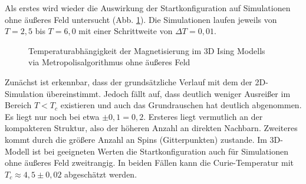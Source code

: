 Als erstes wird wieder die Auswirkung der Startkonfiguration auf Simulationen ohne äußeres Feld untersucht (Abb. \ref{mp3d0modes}). Die Simulationen laufen jeweils von $T=2,5$ bis $T=6,0$ mit einer Schrittweite von $\Delta T= 0,01$.
\begin{figure}[H]
	\centering
	\caption{Temperaturabhängigkeit der Magnetisierung im 3D Ising Modells via Metropolisalgorithmus ohne äußeres Feld}
	\label{mp3d0modes}
\end{figure}
Zunächst ist erkennbar, dass der grundsätzliche Verlauf mit dem der 2D-Simulation übereinstimmt. Jedoch fällt auf, dass deutlich weniger Ausreißer im Bereich $T<T_{c}$ existieren und auch das Grundrauschen hat deutlich abgenommen. Es liegt nur noch bei etwa $\pm 0,1 = 0,2$. Ersteres liegt vermutlich an der kompakteren Struktur, also der höheren Anzahl an direkten Nachbarn. Zweiteres kommt durch die größere Anzahl an Spins (Gitterpunkten) zustande. Im 3D-Modell ist bei geeigneten Werten die Startkonfiguration auch für Simulationen ohne äußeres Feld zweitrangig. In beiden Fällen kann die Curie-Temperatur mit $T_{c}\approx 4,5\pm 0,02$ abgeschätzt werden.


